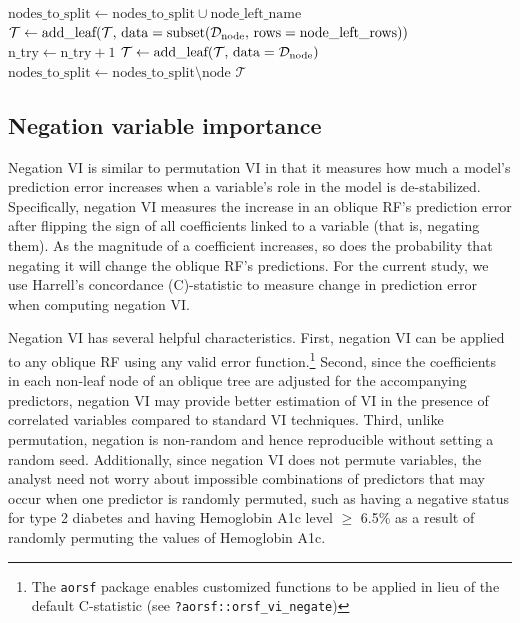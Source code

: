 \documentclass[twoside,11pt]{article}\usepackage[]{graphicx}\usepackage[]{xcolor}
\newcommand{\dataset}{{\cal D}}
\newcommand{\ie}{that is}
\begin{document}
\begin{algorithm}
\begin{algorithmic}[1]
           \State $\text{nodes\_to\_split} \gets \text{nodes\_to\_split} \cup \text{node\_left\_name}$
         \Else
           \State $\mathcal{T} \gets \text{add\_leaf}(\mathcal{T},\, \text{data} = \text{subset}(\dataset_{\text{node}},\,\text{rows} = \text{node\_left\_rows}))$
         \EndIf
         \State $\text{n\_try} \gets \text{n\_try} + 1$
         \State {}
       \Else
         \State $\mathcal{T} \gets \text{add\_leaf}(\mathcal{T},\, \text{data} =\dataset_{\text{node}})$
       \EndIf
       \State $\text{nodes\_to\_split} \gets \text{nodes\_to\_split} \setminus \text{node}$
     \EndFor
  \State \Return $\mathcal{T}$
  \end{algorithmic}
\end{algorithm}

\subsection{Negation variable importance}

Negation VI is similar to permutation VI in that it measures how much a model’s prediction error increases when a variable’s role in the model is de-stabilized. Specifically, negation VI measures the increase in an oblique RF's prediction error after flipping the sign of all coefficients linked to a variable (\ie, negating them). As the magnitude of a coefficient increases, so does the probability that negating it will change the oblique RF's predictions. For the current study, we use Harrell's concordance (C)-statistic \citep{harrell1982evaluating} to measure change in prediction error when computing negation VI.

Negation VI has several helpful characteristics. First, negation VI can be applied to any oblique RF using any valid error function.\footnote{The \texttt{aorsf} package enables customized functions to be applied in lieu of the default C-statistic (see \texttt{?aorsf::orsf\_vi\_negate})} Second, since the coefficients in each non-leaf node of an oblique tree are adjusted for the accompanying predictors, negation VI may provide better estimation of VI in the presence of correlated variables compared to standard VI techniques. Third, unlike permutation, negation is non-random and hence reproducible without setting a random seed. Additionally, since negation VI does not permute variables, the analyst need not worry about impossible combinations of predictors that may occur when one predictor is randomly permuted, such as having a negative status for type 2 diabetes and having Hemoglobin A1c level $\geq$ 6.5\% as a result of randomly permuting the values of Hemoglobin A1c.
\end{document}
